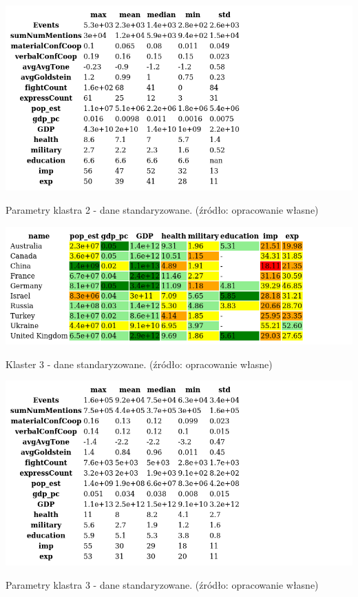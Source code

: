 \documentclass[11pt]{report}
\begin{document}
    \begin{table}[!htp]
        \centering
        \includegraphics[width=\linewidth]{tables/CLUST/desc/clust2std_desc.png}
        \caption{Parametry klastra 2 - dane standaryzowane. (źródło: opracowanie własne)}
        \label{tab:cl2std_desc}
    \end{table}

    \begin{table}[!htp]
        \centering
        \includegraphics[width=\linewidth]{tables/CLUST/cluster3stdkmeans.png}
        \caption{Klaster 3 - dane standaryzowane. (źródło: opracowanie własne)}
        \label{tab:cl3std}
    \end{table}

    \begin{table}[!htp]
        \centering
        \includegraphics[width=\linewidth]{tables/CLUST/desc/clust3std_desc.png}
        \caption{Parametry klastra 3 - dane standaryzowane. (źródło: opracowanie własne)}
        \label{tab:cl3std_desc}
    \end{table}
\end{document}
